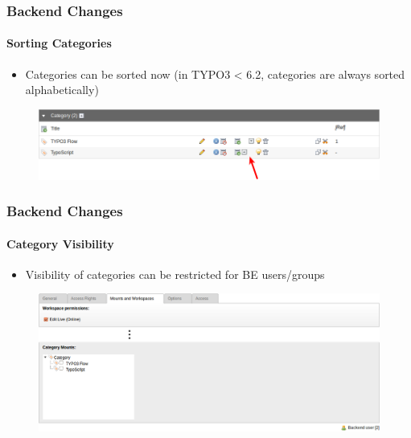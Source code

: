 
\begin{frame}[fragile]
	\frametitle{Backend Changes}
	\framesubtitle{Sorting Categories}

 	\begin{itemize}
		\item Categories can be sorted now\newline
			\small(in TYPO3 < 6.2, categories are always sorted alphabetically)\normalsize
	\end{itemize}

	\begin{figure}
		\includegraphics[width=0.95\linewidth]{Images/BackendChanges/CategorySorting.png}
	\end{figure}

\end{frame}


\begin{frame}[fragile]
	\frametitle{Backend Changes}
	\framesubtitle{Category Visibility}

 	\begin{itemize}
		\item Visibility of categories can be restricted for BE users/groups
	\end{itemize}

	\begin{figure}
		\includegraphics[width=0.95\linewidth]{Images/BackendChanges/CategoryVisibility.png}
	\end{figure}

\end{frame}

